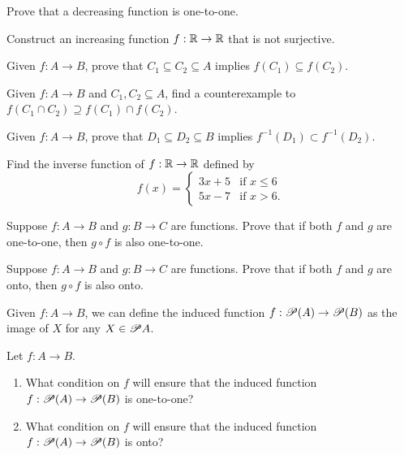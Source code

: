 \documentclass[12pt]{article}
\begin{document}
\begin{qu}
Prove that a decreasing function is one-to-one.
\end{qu}

\begin{qu}
Construct an increasing function $f: \mathbb R \to \mathbb R$ that is not surjective.
\end{qu}

\begin{qu}
Given $f: A \to B$, prove that  $C_1 \subseteq C_2 \subseteq A$ implies $f(C_1) \subseteq f(C_2)$.
\end{qu}

\begin{qu}
Given $f: A \to B$ and  $C_1, C_2 \subseteq A$, find a counterexample to $f(C_1\cap C_2) \supseteq f(C_1) \cap f(C_2)$.
\end{qu}

\begin{qu}
Given $f: A \to B$, prove that  $D_1 \subseteq D_2 \subseteq B$ implies $f^{-1}(D_1) \subset f^{-1}(D_2)$.
\end{qu}

\begin{qu} Find the inverse function of $f: \mathbb R \to \mathbb R$ defined by 
\[f(x)=\begin{cases}
3x+5 & \textrm{if } x \leq 6\\
5x-7 & \textrm{if } x > 6.
\end{cases} \]
\end{qu}

\begin{qu}
Suppose $f:A \to B$ and $g: B \to C$ are functions. Prove that if both $f$ and $g$ are one-to-one, then $g \circ f$ is also one-to-one.
\end{qu}

\begin{qu}
Suppose $f:A \to B$ and $g: B \to C$ are functions. Prove that if both $f$ and $g$ are onto, then $g \circ f$ is also onto.
\end{qu}

\begin{defn} Given $f:A \to B$, we can define the induced function $f: \mathscr{P}(A) \to \mathscr{P}(B)$ as the image of $X$ for any $X \in \mathscr{P}{A}$.
\end{defn}

\begin{qu}
Let $f: A \to B$.
\begin{enumerate}[label=\alph*)]
\item What condition on $f$ will ensure that the induced function $f: \mathscr{P}(A) \to \mathscr{P}(B)$ is one-to-one?
\item What condition on $f$ will ensure that the induced function $f: \mathscr{P}(A) \to \mathscr{P}(B)$ is onto?
\end{enumerate}
\end{qu}
\end{document}
